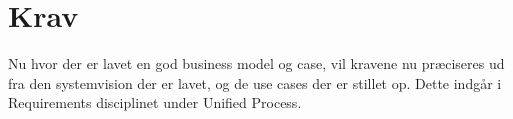 \chapter{Krav}\label{ch:krav}
Nu hvor der er lavet en god business model og case, vil kravene nu præciseres ud fra den systemvision der er lavet, og de use cases der er stillet op. Dette indgår i Requirements disciplinet under Unified Process\cite{UnifiedProcess}.



 